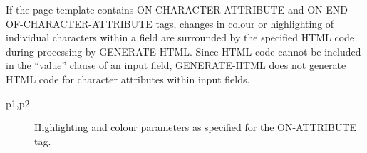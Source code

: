 \documentclass[letterpaper,10pt,english]{sphinxmanual}
\begin{document}
\begin{sphinxVerbatim}[commandchars=\\\{\}]
   
  
   
  
\end{sphinxVerbatim}



If the page template contains ON-CHARACTER-ATTRIBUTE and ON-END-OF-CHARACTER-ATTRIBUTE tags, changes in
colour or highlighting of individual characters within a field are surrounded by the specified HTML code during
processing by GENERATE-HTML. Since HTML code cannot be included in the “value” clause of an input field,
GENERATE-HTML does not generate HTML code for character attributes within input fields.

\begin{sphinxVerbatim}[commandchars=\\\{\}]
      
\end{sphinxVerbatim}
\begin{description}
\item[{p1,p2}] \leavevmode
Highlighting and colour parameters as specified for the ON-ATTRIBUTE tag.

\end{description}
\end{document}
